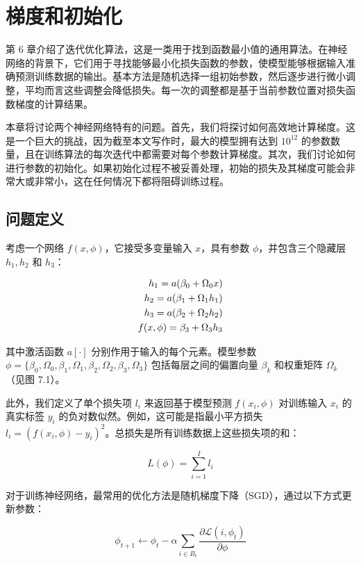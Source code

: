 \chapter{梯度和初始化}
第 6 章介绍了迭代优化算法，这是一类用于找到函数最小值的通用算法。在神经网络的背景下，它们用于寻找能够最小化损失函数的参数，使模型能够根据输入准确预测训练数据的输出。基本方法是随机选择一组初始参数，然后逐步进行微小调整，平均而言这些调整会降低损失。每一次的调整都是基于当前参数位置对损失函数梯度的计算结果。

本章将讨论两个神经网络特有的问题。首先，我们将探讨如何高效地计算梯度。这是一个巨大的挑战，因为截至本文写作时，最大的模型拥有达到 $10^12$ 的参数数量，且在训练算法的每次迭代中都需要对每个参数计算梯度。其次，我们讨论如何进行参数的初始化。如果初始化过程不被妥善处理，初始的损失及其梯度可能会非常大或非常小，这在任何情况下都将阻碍训练过程。
\section{问题定义}
考虑一个网络 \(f(x, \phi)\)，它接受多变量输入 \(x\)，具有参数 \(\phi\)，并包含三个隐藏层 \(h_1, h_2\) 和 \(h_3\)：


\begin{align}
h_1 = a(\beta_0 + \Omega_0x) \notag \\
h_2 = a(\beta_1 + \Omega_1h_1) \notag \\
h_3 = a(\beta_2 + \Omega_2h_2) \notag \\
f(x, \phi) = \beta_3 + \Omega_3h_3 
\end{align} 


其中激活函数 \(a[\cdot]\) 分别作用于输入的每个元素。模型参数 \(\phi = \{\beta_0,\Omega_0,\beta_1,\Omega_1,\beta_2,\Omega_2,\beta_3,\Omega_3\}\) 包括每层之间的偏置向量 \(\beta_k\) 和权重矩阵 \(\Omega_k\)（见图 7.1）。


此外，我们定义了单个损失项 \(l_i\) 来返回基于模型预测 \(f(x_i, \phi)\) 对训练输入 \(x_i\) 的真实标签 \(y_i\) 的负对数似然。例如，这可能是指最小平方损失 \(l_i = (f(x_i, \phi) - y_i)^2\)。总损失是所有训练数据上这些损失项的和：

\begin{equation}
L(\phi) = \sum_{i=1}^{I} l_i 
\end{equation}

对于训练神经网络，最常用的优化方法是随机梯度下降（SGD），通过以下方式更新参数：

\begin{equation}
\phi_{t+1} \leftarrow \phi_t - \alpha \sum_{i \in B_t} \frac{\partial \mathcal{L}(i,\phi_t)}{\partial \phi} 
\end{equation}


